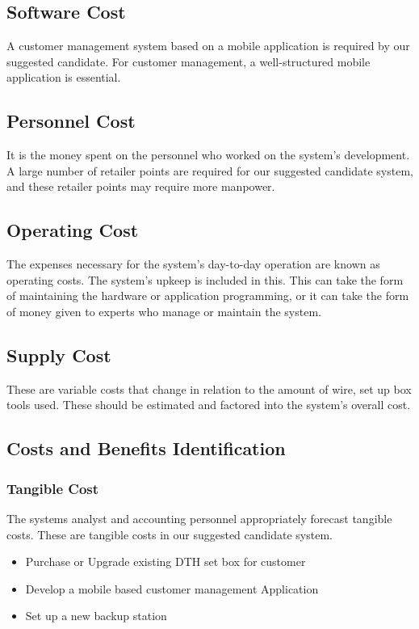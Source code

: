 \begin{spacing}{1}
\subsection {Software Cost}
A customer management system based on a mobile application is required by our suggested candidate. For customer management, a well-structured mobile application is essential.
\subsection {Personnel Cost}
It is the money spent on the personnel who worked on the system's development. A large number of retailer points are required for our suggested candidate system, and these retailer points may require more manpower.
\subsection {Operating Cost}
The expenses necessary for the system's day-to-day operation are known as operating costs. The system's upkeep is included in this. This can take the form of maintaining the hardware or application programming, or it can take the form of money given to experts who manage or maintain the system.
\subsection {Supply Cost}
These are variable costs that change in relation to the amount of wire, set up box tools used. These should be estimated and factored into the system's overall cost.

\subsection { Costs and Benefits Identification}
\subsubsection {Tangible Cost}
The systems analyst and accounting personnel appropriately forecast tangible costs. These are tangible costs in our suggested candidate system.
\begin {itemize}
\item Purchase or Upgrade existing DTH set box for customer 
\item Develop a mobile based customer management Application
\item Set up a new backup station
\end {itemize} 


\end{spacing}
